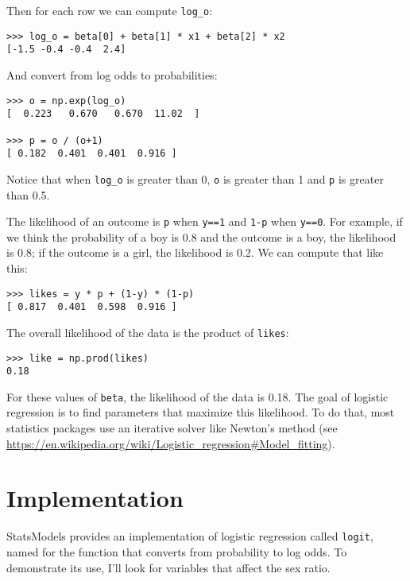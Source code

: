 Then for each row we can compute \verb"log_o":

\begin{verbatim}
>>> log_o = beta[0] + beta[1] * x1 + beta[2] * x2 
[-1.5 -0.4 -0.4  2.4]
\end{verbatim}

And convert from log odds to probabilities:

\begin{verbatim}
>>> o = np.exp(log_o)
[  0.223   0.670   0.670  11.02  ]

>>> p = o / (o+1)
[ 0.182  0.401  0.401  0.916 ]
\end{verbatim}

Notice that when \verb"log_o" is greater than 0, {\tt o}
is greater than 1 and {\tt p} is greater than 0.5.

The likelihood of an outcome is {\tt p} when {\tt y==1} and {\tt 1-p}
when {\tt y==0}.  For example, if we think the probability of a boy is
0.8 and the outcome is a boy, the likelihood is 0.8; if
the outcome is a girl, the likelihood is 0.2.  We can compute that
like this:

\begin{verbatim}
>>> likes = y * p + (1-y) * (1-p)
[ 0.817  0.401  0.598  0.916 ]
\end{verbatim}

The overall likelihood of the data is the product of {\tt likes}:

\begin{verbatim}
>>> like = np.prod(likes)
0.18
\end{verbatim}

For these values of {\tt beta}, the likelihood of the data is 0.18.
The goal of logistic regression is to find parameters that maximize
this likelihood.  To do that, most statistics packages use an
iterative solver like Newton's method (see
\url{https://en.wikipedia.org/wiki/Logistic_regression#Model_fitting}).


\section{Implementation}
\label{implementation}

StatsModels provides an implementation of logistic regression
called {\tt logit}, named for the function that converts from
probability to log odds.  To demonstrate its use, I'll look for
variables that affect the sex ratio.

